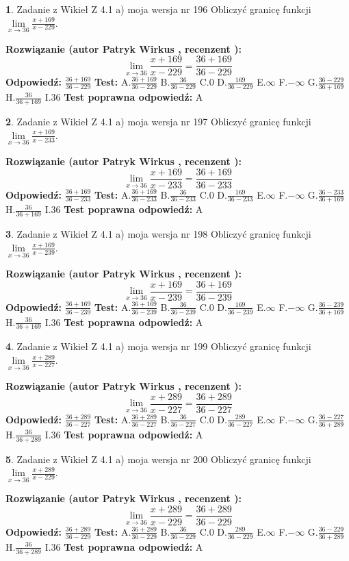 \documentclass[12pt, a4paper]{article}
\theoremstyle{definition} %
\newtheorem{zad}{}
\newcommand{\zadStart}[1]{\begin{zad}#1\newline}
\newcommand{\zadStop}{\end{zad}}
\newcommand{\rozwStart}[2]{\noindent \textbf{Rozwiązanie (autor #1 , recenzent #2): }\newline}
\newcommand{\rozwStop}{\newline}
\newcommand{\odpStart}{\noindent \textbf{Odpowiedź:}\newline}
\newcommand{\odpStop}{\newline}
\newcommand{\testStart}{\noindent \textbf{Test:}\newline}
\newcommand{\testStop}{\newline}
\newcommand{\kluczStart}{\noindent \textbf{Test poprawna odpowiedź:}\newline}
\newcommand{\kluczStop}{\newline}
\begin{document}
\zadStart{Zadanie z Wikieł Z 4.1 a) moja wersja nr 196}
Obliczyć granicę funkcji $\lim\limits_{x\to36}\frac{x+169}{x-229}$.
\zadStop
\rozwStart{Patryk Wirkus}{}
$$\lim\limits_{x\to36}\frac{x+169}{x-229} = \frac{36+169}{36-229}$$
\rozwStop
\odpStart
$\frac{36+169}{36-229}$
\odpStop
\testStart
A.$\frac{36+169}{36-229}$
B.$\frac{36}{36-229}$
C.$0$
D.$\frac{169}{36-229}$
E.$\infty$
F.$-\infty$
G.$\frac{36-229}{36+169}$
H.$\frac{36}{36+169}$
I.$36$
\testStop
\kluczStart
A
\kluczStop



\zadStart{Zadanie z Wikieł Z 4.1 a) moja wersja nr 197}
Obliczyć granicę funkcji $\lim\limits_{x\to36}\frac{x+169}{x-233}$.
\zadStop
\rozwStart{Patryk Wirkus}{}
$$\lim\limits_{x\to36}\frac{x+169}{x-233} = \frac{36+169}{36-233}$$
\rozwStop
\odpStart
$\frac{36+169}{36-233}$
\odpStop
\testStart
A.$\frac{36+169}{36-233}$
B.$\frac{36}{36-233}$
C.$0$
D.$\frac{169}{36-233}$
E.$\infty$
F.$-\infty$
G.$\frac{36-233}{36+169}$
H.$\frac{36}{36+169}$
I.$36$
\testStop
\kluczStart
A
\kluczStop



\zadStart{Zadanie z Wikieł Z 4.1 a) moja wersja nr 198}
Obliczyć granicę funkcji $\lim\limits_{x\to36}\frac{x+169}{x-239}$.
\zadStop
\rozwStart{Patryk Wirkus}{}
$$\lim\limits_{x\to36}\frac{x+169}{x-239} = \frac{36+169}{36-239}$$
\rozwStop
\odpStart
$\frac{36+169}{36-239}$
\odpStop
\testStart
A.$\frac{36+169}{36-239}$
B.$\frac{36}{36-239}$
C.$0$
D.$\frac{169}{36-239}$
E.$\infty$
F.$-\infty$
G.$\frac{36-239}{36+169}$
H.$\frac{36}{36+169}$
I.$36$
\testStop
\kluczStart
A
\kluczStop



\zadStart{Zadanie z Wikieł Z 4.1 a) moja wersja nr 199}
Obliczyć granicę funkcji $\lim\limits_{x\to36}\frac{x+289}{x-227}$.
\zadStop
\rozwStart{Patryk Wirkus}{}
$$\lim\limits_{x\to36}\frac{x+289}{x-227} = \frac{36+289}{36-227}$$
\rozwStop
\odpStart
$\frac{36+289}{36-227}$
\odpStop
\testStart
A.$\frac{36+289}{36-227}$
B.$\frac{36}{36-227}$
C.$0$
D.$\frac{289}{36-227}$
E.$\infty$
F.$-\infty$
G.$\frac{36-227}{36+289}$
H.$\frac{36}{36+289}$
I.$36$
\testStop
\kluczStart
A
\kluczStop



\zadStart{Zadanie z Wikieł Z 4.1 a) moja wersja nr 200}
Obliczyć granicę funkcji $\lim\limits_{x\to36}\frac{x+289}{x-229}$.
\zadStop
\rozwStart{Patryk Wirkus}{}
$$\lim\limits_{x\to36}\frac{x+289}{x-229} = \frac{36+289}{36-229}$$
\rozwStop
\odpStart
$\frac{36+289}{36-229}$
\odpStop
\testStart
A.$\frac{36+289}{36-229}$
B.$\frac{36}{36-229}$
C.$0$
D.$\frac{289}{36-229}$
E.$\infty$
F.$-\infty$
G.$\frac{36-229}{36+289}$
H.$\frac{36}{36+289}$
I.$36$
\testStop
\kluczStart
A
\kluczStop
\end{document}
